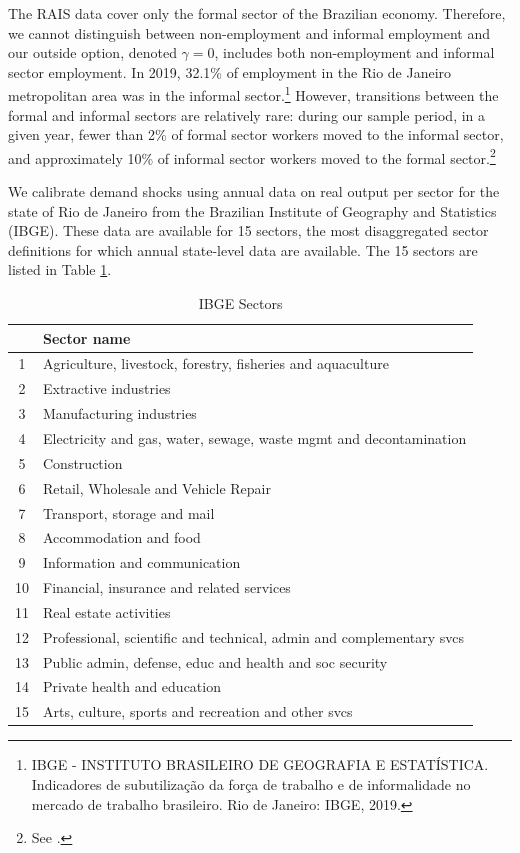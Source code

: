 \documentclass[12pt]{article}
\def\g{\gamma}
\theoremstyle{definition}
\theoremstyle{plain}
\begin{document}
The RAIS data  cover only the formal sector of the Brazilian economy. Therefore, we cannot distinguish between non-employment and informal employment and our outside option, denoted $\g=0$,  includes both non-employment and informal sector employment.  In 2019, 32.1\% of employment in the Rio de Janeiro metropolitan area was in the informal sector.\footnote{IBGE - INSTITUTO BRASILEIRO DE GEOGRAFIA E ESTATÍSTICA. Indicadores de subutilização da força de trabalho e de informalidade no mercado de trabalho brasileiro. Rio de Janeiro: IBGE, 2019.} However, transitions between the formal and informal sectors are relatively rare: during our sample period, in a given year, fewer than 2\% of formal sector workers moved to the informal sector, and approximately 10\% of informal sector workers moved to the formal sector.\footnote{See \citet[ Figure 21]{EngbomGonzagaMoserOlivieri2021}.}

We calibrate demand shocks using annual data on real output per sector for the state of Rio de Janeiro from the Brazilian Institute of Geography and Statistics  (IBGE). These data are available for 15 sectors, the most disaggregated sector definitions for which annual state-level data are available. The 15 sectors are listed in Table \ref{table:IBGE_sectors}. 


\begin{table}
	\centering
	\caption{IBGE Sectors}
	\begin{tabular}{cl}
		\toprule
		& Sector name \\
		\midrule
		1	& Agriculture, livestock, forestry, fisheries and aquaculture  \\
		2	& Extractive industries  \\
		3	& Manufacturing industries  \\
		4	& Electricity and gas, water, sewage, waste mgmt and decontamination  \\
		5	& Construction  \\
		6	& Retail, Wholesale and Vehicle Repair  \\
		7	& Transport, storage and mail  \\
		8	& Accommodation and food  \\
		9	& Information and communication  \\
		10	& Financial, insurance and related services  \\
		11	& Real estate activities  \\
		12	& Professional, scientific and technical, admin and complementary svcs  \\
		13	& Public admin, defense, educ and health and soc security  \\
		14	& Private health and education  \\
		15	& Arts, culture, sports and recreation and other svcs \\
		\bottomrule
	\end{tabular}
	\label{table:IBGE_sectors}
\end{table}
\end{document}
